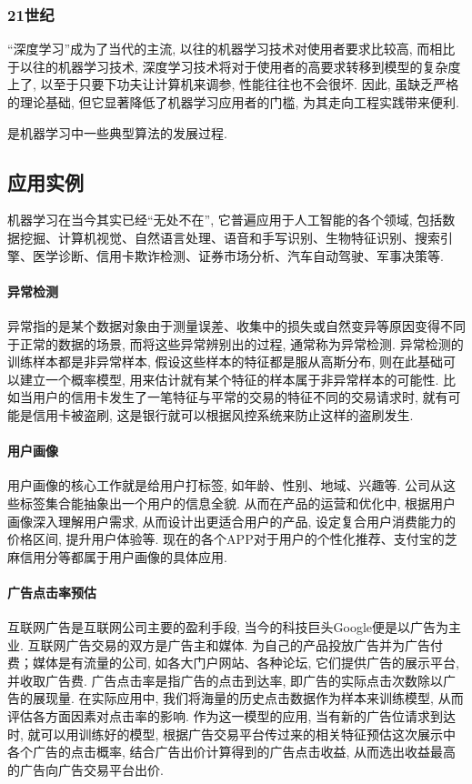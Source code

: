 \documentclass[lang=cn,11pt,a4paper]{elegantpaper}
\begin{document}
\subsubsection*{21世纪}
“深度学习”成为了当代的主流, 以往的机器学习技术对使用者要求比较高, 而相比于以往的机器学习技术, 深度学习技术将对于使用者的高要求转移到模型的复杂度上了, 以至于只要下功夫让计算机来调参, 性能往往也不会很坏. 因此, 虽缺乏严格的理论基础, 但它显著降低了机器学习应用者的门槛, 为其走向工程实践带来便利.
\par {} 是机器学习中一些典型算法的发展过程.
\subsection{应用实例}
\par 机器学习在当今其实已经“无处不在”, 它普遍应用于人工智能的各个领域, 包括数据挖掘、计算机视觉、自然语言处理、语音和手写识别、生物特征识别、搜索引擎、医学诊断、信用卡欺诈检测、证券市场分析、汽车自动驾驶、军事决策等.
\paragraph{异常检测}异常指的是某个数据对象由于测量误差、收集中的损失或自然变异等原因变得不同于正常的数据的场景, 而将这些异常辨别出的过程, 通常称为异常检测. 异常检测的训练样本都是非异常样本, 假设这些样本的特征都是服从高斯分布, 则在此基础可以建立一个概率模型, 用来估计就有某个特征的样本属于非异常样本的可能性. 比如当用户的信用卡发生了一笔特征与平常的交易的特征不同的交易请求时, 就有可能是信用卡被盗刷, 这是银行就可以根据风控系统来防止这样的盗刷发生.
\paragraph{用户画像}用户画像的核心工作就是给用户打标签, 如年龄、性别、地域、兴趣等. 公司从这些标签集合能抽象出一个用户的信息全貌. 从而在产品的运营和优化中, 根据用户画像深入理解用户需求, 从而设计出更适合用户的产品, 设定复合用户消费能力的价格区间, 提升用户体验等. 现在的各个APP对于用户的个性化推荐、支付宝的芝麻信用分等都属于用户画像的具体应用.
\paragraph{广告点击率预估}互联网广告是互联网公司主要的盈利手段, 当今的科技巨头Google便是以广告为主业. 互联网广告交易的双方是广告主和媒体. 为自己的产品投放广告并为广告付费；媒体是有流量的公司, 如各大门户网站、各种论坛, 它们提供广告的展示平台, 并收取广告费. 广告点击率是指广告的点击到达率, 即广告的实际点击次数除以广告的展现量. 在实际应用中, 我们将海量的历史点击数据作为样本来训练模型, 从而评估各方面因素对点击率的影响. 作为这一模型的应用, 当有新的广告位请求到达时, 就可以用训练好的模型, 根据广告交易平台传过来的相关特征预估这次展示中各个广告的点击概率, 结合广告出价计算得到的广告点击收益, 从而选出收益最高的广告向广告交易平台出价. 
\end{document}

